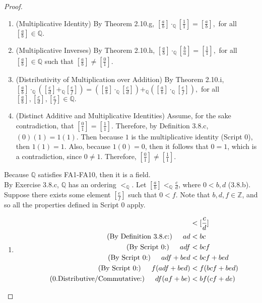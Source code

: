 \documentclass[openany, amssymb, psamsfonts]{amsart}
\newcommand{\bbQ}{\mathbb{Q}}
\newcommand{\bbZ}{\mathbb{Z}}
\theoremstyle{definition}
\numberwithin{equation}{section}
\begin{document}
\begin{proof}
\begin{enumerate}[{FA}1]
		\item  (Multiplicative Identity)  By Theorem 2.10.g, $ \left[\frac{a}{b}\right] \cdot_{\bbQ}\left[\frac{1}{1}\right]=\left[\frac{a}{b}\right],$ for all $ \left[\frac{a}{b}\right] \in\bbQ.$
		\item  (Multiplicative Inverses) By Theorem 2.10.h, $ \left[\frac{a}{b}\right] \cdot_{\bbQ}\left[\frac{b}{a}\right]=\left[\frac{1}{1}\right],$ for all $ \left[\frac{a}{b}\right] \in\bbQ$ such that $\left[\frac{a}{b}\right]\neq \left[\frac{0}{1}\right].$ 
		\item  (Distributivity of Multiplication over Addition)  By Theorem 2.10.i, $ \left[\frac{a}{b}\right]\cdot_{\bbQ} \left(\left[\frac{c}{d}\right]+_{\bbQ}\left[\frac{e}{f}\right]\right)=\left(\left[\frac{a}{b}\right]\cdot_{\bbQ} \left[\frac{c}{d}\right]\right) +_{\bbQ} \left( \left[\frac{a}{b}\right]\cdot_{\bbQ} \left[\frac{e}{f}\right]\right),$ for all $ \left[\frac{a}{b}\right],\left[\frac{c}{d}\right], \left[\frac{e}{f}\right] \in\bbQ.$
		\item  (Distinct Additive and Multiplicative Identities) Assume, for the sake contradiction, that $[\frac{0}{1}] = [\frac{1}{1}]$. Therefore, by Definition 3.8.c, $(0)(1) = 1(1)$. Then because $1$ is the multiplicative identity (Script 0), then $1(1) = 1$. Also, because $1(0) = 0$, then it follows that $0=1$, which is a contradiction, since $0\neq 1$. Therefore, $[\frac{0}{1}] \neq [\frac{1}{1}]$.
\end{enumerate}
Because $\bbQ$ satisfies FA1-FA10, then it is a field.\\
By Exercise 3.8.c, $\bbQ$ has an ordering $<_{\bbQ}$. Let $[\frac{a}{b}]<_{\bbQ}\frac{c}{d}$, where $0<b,d$ (3.8.b). Suppose there exists some element $[\frac{e}{f}]$ such that $0<f$. Note that $b,d,f \in \bbZ$, and so all the properties defined in Script 0 apply. 
\begin{enumerate}
\item 
    \begin{align*}
        [\frac{a}{b}]&< [\frac{c}{d}]\\
        \tag{By Definition 3.8.c:} \indent ad&<bc\\
        \tag{By Script 0:} \indent adf&<bcf\\
        \tag{By Script 0:} \indent adf+bed&<bcf+bed\\
        \tag{By Script 0:} \indent f(adf+bed)&<f(bcf+bed)\\
        \tag{0.Distributive/Commutative:} \indent df(af+be) &< bf(cf+de)\\

\end{align*}
\end{enumerate}
\end{proof}
\end{document}
